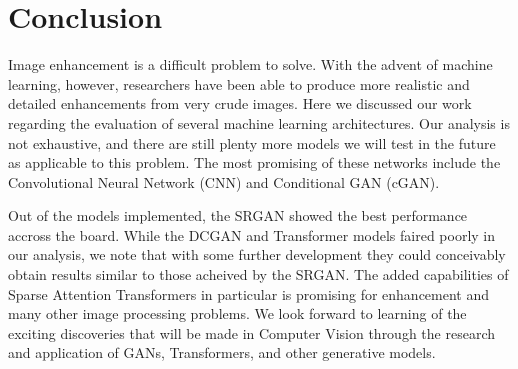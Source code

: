 \documentclass[letterpaper]{article} %
\begin{document}
\section{Conclusion}
Image enhancement is a difficult problem to solve.
With the advent of machine learning, however, researchers have been able to
produce more realistic and detailed enhancements from very crude images.
Here we discussed our work regarding the evaluation of several machine learning architectures.
Our analysis is not exhaustive, and there are still plenty more models we will
test in the future as applicable to this problem.
The most promising of these networks include the
Convolutional Neural Network (CNN) and Conditional GAN (cGAN).

Out of the models implemented, the SRGAN showed the best performance accross the board.
While the DCGAN and Transformer models faired poorly in our analysis,
we note that with some further development they could conceivably obtain results similar to
those acheived by the SRGAN.
The added capabilities of Sparse Attention Transformers in particular is promising
for enhancement and many other image processing problems.
We look forward to learning of the exciting discoveries that will be made in Computer Vision
through the research and application of GANs, Transformers, and other generative models.
\end{document}
